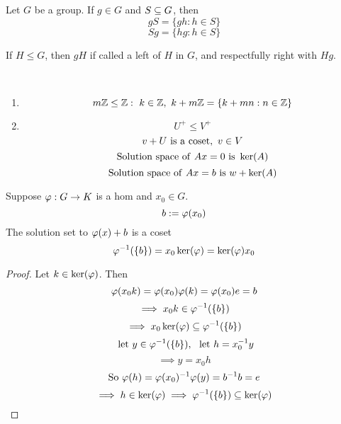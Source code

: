 \documentclass[12pt]{article}
\newcommand\subgroup{\le}
\begin{document}
\bboxdefn
\begin{defn}[Coset]
    Let \(G\) be a group. If \(g\in G\) and \(S\subseteq G\), then
    \[
        gS=\{gh:h\in S\}
    \]
    \[
        Sg=\{hg:h\in S\}
    \]
    
    If \(H \subgroup G\), then \(gH\) if called a left  of \(H\) in \(G\),
    and respectfully right with \(Hg\).
\end{defn}
\ebox

\bboxexam
\begin{exam}\ 
    \begin{enumerate}
        \item
            \[
                m\Z \subgroup \Z: \
                k\in\Z,\ k+m\Z = \{
                    k+mn : n \in \Z
                \}
            \]
        \item 
            \[
                U^+ \subgroup V^+
            \]
            \[
                v+U\ \mathrm{is}\ \mathrm{a\ coset},\ v \in V
            \]
            \[
                \mathrm{Solution\ space\ of\ }Ax=0\ \mathrm{is}\ 
                \ker(A)
            \]
            \[
                \mathrm{Solution\ space\ of\ }Ax=b\ \mathrm{is}\ 
                w + \ker(A)
            \]
    \end{enumerate}
\end{exam}
\ebox

\bboxprop
\begin{prop}
    Suppose \(\varphi : G \to K\) is a hom and \(x_0\in G\).
    \[
        b := \varphi(x_0)
    \]
    The solution set to \(\varphi(x)+b\) is a coset
    \[
        \varphi^{-1}(\{b\})
        =x_0\ker(\varphi)=\ker(\varphi)x_0
    \]
\end{prop}
\ebox

\bboxproof
\begin{proof}
    Let \(k\in\ker(\varphi)\). Then
    \[
        \varphi(x_0k)=\varphi(x_0)\varphi(k)=\varphi(x_0)e=b
    \]
    \[
        \implies x_0k\in\varphi^{-1}(\{b\})
    \]
    \[
        \implies x_0\ker(\varphi)\subseteq\varphi^{-1}(\{b\})
    \]
    \[
        \llet y\in\vphi^{-1}(\{b\}),\ 
        \llet h=x^{-1}_0 y
    \]
    \[
        \implies y = x_0 h
    \]
    \[
        \text{So }\varphi(h)=\varphi(x_0)^{-1}\varphi(y)
        =b^{-1}b=e
    \]
    \[
        \implies h \in\ker(\varphi)
        \implies \varphi^{-1}(\{b\})\subseteq \ker(\varphi)
    \]
\end{proof}
\ebox


\end{document}
